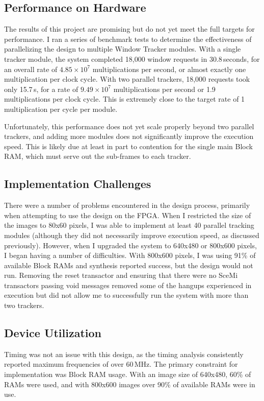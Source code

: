\documentclass{article}
\begin{document}
\subsection{Performance on Hardware}
\label{sec:performance}
The results of this project are promising but do not yet meet the full targets for performance. I ran a series of benchmark tests to determine the effectiveness of parallelizing the design to multiple Window Tracker modules. With a single tracker module, the system completed 18,000 window requests in 30.8\,seconds, for an overall rate of $4.85 \times 10^7$ multiplications per second, or almost exactly one multiplication per clock cycle. With two parallel trackers, 18,000 requests took only 15.7\,s, for a rate of $9.49\times10^7$ multiplications per second or 1.9 multiplications per clock cycle. This is extremely close to the target rate of 1 multiplication per cycle per module. 

Unfortunately, this performance does not yet scale properly beyond two parallel trackers, and adding more modules does not significantly improve the execution speed. This is likely due at least in part to contention for the single main Block RAM, which must serve out the sub-frames to each tracker. 

\subsection{Implementation Challenges}
There were a number of problems encountered in the design process, primarily when attempting to use the design on the FPGA. When I restricted the size of the images to 80x60 pixels, I was able to implement at least 40 parallel tracking modules (although they did not necessarily improve execution speed, as discussed previously). However, when I upgraded the system to 640x480 or 800x600 pixels, I began having a number of difficulties. With 800x600 pixels, I was using 91\% of available Block RAMs and synthesis reported success, but the design would not run. Removing the reset transactor and ensuring that there were no SceMi transactors passing void messages removed some of the hangups experienced in execution but did not allow me to successfully run the system with more than two trackers. 

\subsection{Device Utilization}
Timing was not an issue with this design, as the timing analysis consistently reported maximum frequencies of over 60\,MHz. The primary constraint for implementation was Block RAM usage. With an image size of 640x480, 60\% of RAMs were used, and with 800x600 images over 90\% of available RAMs were in use. 
\end{document}
